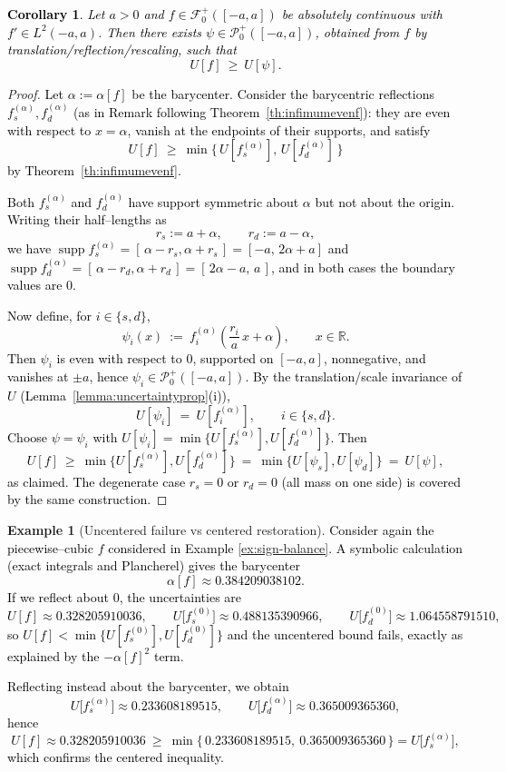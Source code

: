 \documentclass[preprint,hidelinks,authoryear]{elsarticle}
\newtheorem{Cor}[Thm]{Corollary}
\theoremstyle{plain}
\theoremstyle{definition}
\newtheorem{example}[theorem]{Example}
\theoremstyle{remark}
\begin{document}
\textcolor{black}{\begin{Cor}
Let $a>0$ and $f \in \mathcal{F}_0^{+}([-a,a])$ be absolutely continuous with $f'\in L^2(-a,a)$. Then there exists $\psi\in\mathcal{P}_0^{+}([-a,a])$, obtained from $f$ by translation/reflection/rescaling, such that
$$
U[f]\ \ge\ U[\psi].
$$
\end{Cor}}

\begin{proof}
\textcolor{black}{Let $\alpha:=\alpha[f]$ be the barycenter. Consider the barycentric reflections $f_s^{(\alpha)},f_d^{(\alpha)}$ (as in Remark following Theorem~\ref{th:infimumevenf}): they are even with respect to $x=\alpha$, vanish at the endpoints of their supports, and satisfy
$$
U[f]\ \ge\ \min\{\,U[f_s^{(\alpha)}],\,U[f_d^{(\alpha)}]\,\}
$$
by Theorem~\ref{th:infimumevenf}.}

\textcolor{black}{Both $f_s^{(\alpha)}$ and $f_d^{(\alpha)}$ have support symmetric about $\alpha$ but not about the origin. Writing their half–lengths as
$$
r_s:=a+\alpha, \qquad r_d:=a-\alpha,
$$
we have $\operatorname{supp} f_s^{(\alpha)}=[\,\alpha-r_s,\alpha+r_s\,]=[-a,\,2\alpha+a]$ and $\operatorname{supp} f_d^{(\alpha)}=[\,\alpha-r_d,\alpha+r_d\,]=[\,2\alpha-a,\,a\,]$, and in both cases the boundary values are $0$.}

\textcolor{black}{Now define, for $i\in\{s,d\}$,
$$
\psi_i(x)\ :=\ f_i^{(\alpha)}\!\left(\frac{r_i}{a}\,x+\alpha\right),\qquad x\in\mathbb{R}.
$$
Then $\psi_i$ is even with respect to $0$, supported on $[-a,a]$, nonnegative, and vanishes at $\pm a$, hence $\psi_i\in\mathcal{P}_0^{+}([-a,a])$. By the translation/scale invariance of $U$ (Lemma~\ref{lemma:uncertaintyprop}(i)),
$$
U[\psi_i]\ =\ U\!\left[f_i^{(\alpha)}\right],\qquad i\in\{s,d\}.
$$
Choose $\psi=\psi_i$ with $U[\psi_i]=\min\{U[f_s^{(\alpha)}],U[f_d^{(\alpha)}]\}$. Then
$$
U[f]\ \ge\ \min\{U[f_s^{(\alpha)}],U[f_d^{(\alpha)}]\}\ =\ \min\{U[\psi_s],U[\psi_d]\}\ =\ U[\psi],
$$
as claimed. The degenerate case $r_s=0$ or $r_d=0$ (all mass on one side) is covered by the same construction.}
\end{proof}


\begin{example}[Uncentered failure vs centered restoration]
\textcolor{black}{Consider again the piecewise–cubic $f$ considered in Example \ref{ex:sign-balance}. A symbolic calculation (exact integrals and Plancherel) gives the barycenter
$$
\alpha[f]\approx 0.384209038102.
$$
If we reflect about $0$, the uncertainties are
$$
U[f]\approx 0.328205910036,\qquad
U\big[f_s^{(0)}\big]\approx 0.488135390966,\qquad
U\big[f_d^{(0)}\big]\approx 1.064558791510,
$$
so $U[f]<\min\{U[f_s^{(0)}],U[f_d^{(0)}]\}$ and the uncentered bound fails, exactly as
explained by the $-\alpha[f]^2$ term.}

\textcolor{black}{Reflecting instead about the barycenter, we obtain
$$
U\big[f_s^{(\alpha)}\big]\approx 0.233608189515,\qquad
U\big[f_d^{(\alpha)}\big]\approx 0.365009365360,
$$
hence
$$
U[f]\approx 0.328205910036\ \ge\ \min\{\,0.233608189515,\ 0.365009365360\,\}
=U\big[f_s^{(\alpha)}\big],
$$
which confirms the centered inequality.}
\end{example}
\end{document}
